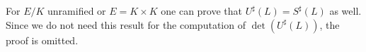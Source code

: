 \begin{remark}
For $E/K$ unramified or $E=K \times K$ one can prove that $U^\sharp(L)= S^\sharp(L)$ as well. Since we do not need this result for the computation of $\det(U^\sharp(L))$, the proof is omitted.
\end{remark}
%
%
%
